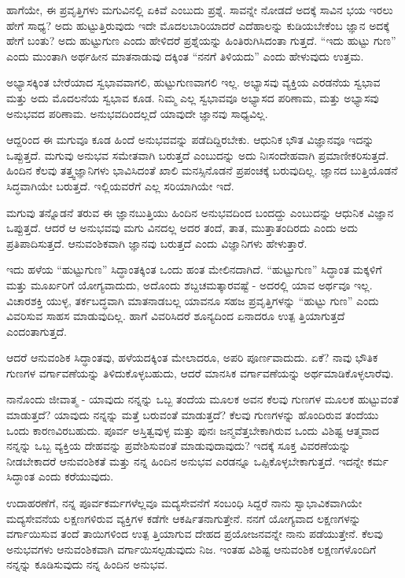ಹಾಗೆಯೇ, ಈ ಪ್ರವೃತ್ತಿಗಳು ಮಗುವಿನಲ್ಲಿ ಏಕಿವೆ ಎಂಬುದು ಪ್ರಶ್ನೆ. ಸಾವನ್ನೇ ನೋಡದೆ ಅದಕ್ಕೆ ಸಾವಿನ ಭಯ ಇರಲು ಹೇಗೆ ಸಾಧ್ಯ? ಅದು ಹುಟ್ಟುತ್ತಿರುವುದು ಇದೇ ಮೊದಲಬಾರಿಯಾದರೆ ಎದೆಹಾಲನ್ನು ಕುಡಿಯಬೇಕೆಂಬ ಜ್ಞಾನ ಅದಕ್ಕೆ ಹೇಗೆ ಬಂತು? ಅದು ಹುಟ್ಟುಗುಣ ಎಂದು ಹೇಳಿದರೆ ಪ್ರಶ್ನೆಯನ್ನು ಹಿಂತಿರುಗಿಸಿದಂತಾ ಗುತ್ತದೆ. “ಇದು ಹುಟ್ಟು ಗುಣ” ಎಂದು ಮುಂತಾಗಿ ಅರ್ಥಹೀನ ಮಾತನಾಡುವು ದಕ್ಕಿಂತ “ನನಗೆ ತಿಳಿಯದು” ಎಂದು ಹೇಳುವುದು ಉತ್ತಮ.

ಅಭ್ಯಾಸಕ್ಕಿಂತ  ಬೇರೆಯಾದ ಸ್ವಭಾವವಾಗಲಿ, ಹುಟ್ಟುಗುಣವಾಗಲಿ ಇಲ್ಲ. ಅಭ್ಯಾಸವು ವ್ಯಕ್ತಿಯ ಎರಡನೆಯ ಸ್ವಭಾವ ಮತ್ತು ಅದು ಮೊದಲನೆಯ ಸ್ವಭಾವ ಕೂಡ. ನಿಮ್ಮ ಎಲ್ಲ ಸ್ವಭಾವವೂ ಅಭ್ಯಾಸದ ಪರಿಣಾಮ, ಮತ್ತು ಅಭ್ಯಾಸವು ಅನುಭವದ ಪರಿಣಾಮ. ಅನುಭವದಿಂದಲ್ಲದೆ ಯಾವುದೇ ಜ್ಞಾನವು ಸಾಧ್ಯವಿಲ್ಲ.

ಆದ್ದರಿಂದ ಈ ಮಗುವೂ ಕೂಡ ಹಿಂದೆ ಅನುಭವವನ್ನು ಪಡೆದಿದ್ದಿರಬೇಕು. ಆಧುನಿಕ ಭೌತ ವಿಜ್ಞಾನವೂ ಇದನ್ನು ಒಪ್ಪುತ್ತದೆ. ಮಗುವು ಅನುಭವ ಸಮೇತವಾಗಿ ಬರುತ್ತದೆ ಎಂಬುದನ್ನು ಅದು ನಿಃಸಂದೇಹವಾಗಿ ಪ್ರಮಾಣೀಕರಿಸುತ್ತದೆ. ಹಿಂದಿನ ಕೆಲವು ತತ್ತ್ವಜ್ಞಾನಿಗಳು ಭಾವಿಸಿದಂತೆ ಖಾಲಿ ಮನಸ್ಸಿನೊಡನೆ ಪ್ರಪಂಚಕ್ಕೆ ಬರುವುದಿಲ್ಲ. ಜ್ಞಾನದ ಬುತ್ತಿಯೊಡನೆ ಸಿದ್ಧವಾಗಿಯೇ ಬರುತ್ತದೆ. ಇಲ್ಲಿಯವರೆಗೆ ಎಲ್ಲ ಸರಿಯಾಗಿಯೇ ಇದೆ.

ಮಗುವು ತನ್ನೊಡನೆ ತರುವ ಈ ಜ್ಞಾನಬುತ್ತಿಯು ಹಿಂದಿನ ಅನುಭವದಿಂದ ಬಂದದ್ದು ಎಂಬುದನ್ನು ಆಧುನಿಕ ವಿಜ್ಞಾನ ಒಪ್ಪುತ್ತದೆ. ಆದರೆ ಆ ಅನುಭವವು ಮಗು ವಿನದಲ್ಲ ಅದರ ತಂದೆ, ತಾತ, ಮುತ್ತಾತಂದಿರದು ಎಂದು ಅದು ಪ್ರತಿಪಾದಿಸುತ್ತದೆ. ಆನುವಂಶಿಕವಾಗಿ ಜ್ಞಾನವು ಬರುತ್ತದೆ ಎಂದು ವಿಜ್ಞಾನಿಗಳು ಹೇಳುತ್ತಾರೆ.

ಇದು ಹಳೆಯ “ಹುಟ್ಟುಗುಣ” ಸಿದ್ಧಾಂತಕ್ಕಿಂತ ಒಂದು ಹಂತ ಮೇಲಿನದಾಗಿದೆ. “ಹುಟ್ಟುಗುಣ” ಸಿದ್ಧಾಂತ ಮಕ್ಕಳಿಗೆ ಮತ್ತು ಮೂರ್ಖರಿಗೆ ಯೋಗ್ಯವಾದುದು, ಅದೊಂದು ಶಬ್ದಚಮತ್ಕಾರವಷ್ಟೆ - ಅದರಲ್ಲಿ ಯಾವ ಅರ್ಥವೂ ಇಲ್ಲ. ವಿಚಾರಶಕ್ತಿ ಯುಳ್ಳ, ತರ್ಕಬದ್ಧವಾಗಿ ಮಾತನಾಡಬಲ್ಲ ಯಾವನೂ ಸಹಜ ಪ್ರವೃತ್ತಿಗಳನ್ನು “ಹುಟ್ಟು ಗುಣ” ಎಂದು ವಿವರಿಸುವ ಸಾಹಸ ಮಾಡುವುದಿಲ್ಲ. ಹಾಗೆ ವಿವರಿಸಿದರೆ ಶೂನ್ಯದಿಂದ ಏನಾದರೂ ಉತ್ಪ ತ್ತಿಯಾಗುತ್ತದೆ ಎಂದಂತಾಗುತ್ತದೆ.

ಆದರೆ ಆನುವಂಶಿಕ ಸಿದ್ಧಾಂತವು, ಹಳೆಯದಕ್ಕಿಂತ ಮೇಲಾದರೂ, ಅಪರಿ ಪೂರ್ಣವಾದುದು. ಏಕೆ? ನಾವು ಭೌತಿಕ ಗುಣಗಳ ವರ್ಗಾವಣೆಯನ್ನು ತಿಳಿದುಕೊಳ್ಳಬಹುದು, ಆದರೆ ಮಾನಸಿಕ ವರ್ಗಾವಣೆಯನ್ನು ಅರ್ಥಮಾಡಿಕೊಳ್ಳಲಾರೆವು.

ನಾನೊಂದು ಜೀವಾತ್ಮ - ಯಾವುದು ನನ್ನನ್ನು ಒಬ್ಬ ತಂದೆಯ ಮೂಲಕ ಅವನ ಕೆಲವು ಗುಣಗಳ ಮೂಲಕ ಹುಟ್ಟುವಂತೆ ಮಾಡುತ್ತದೆ? ಯಾವುದು ನನ್ನನ್ನು ಮತ್ತೆ ಬರುವಂತೆ ಮಾಡುತ್ತದೆ? ಕೆಲವು ಗುಣಗಳನ್ನು ಹೊಂದಿರುವ ತಂದೆಯು ಒಂದು ಕಾರಣವಿರಬಹುದು. ಪೂರ್ವ ಅಸ್ತಿತ್ವವುಳ್ಳ ಮತ್ತು ಪುನಃ ಜನ್ಮವೆತ್ತಬೇಕಾಗಿರುವ ಒಂದು ವಿಶಿಷ್ಟ ಆತ್ಮವಾದ ನನ್ನನ್ನು ಒಬ್ಬ ವ್ಯಕ್ತಿಯ ದೇಹವನ್ನು ಪ್ರವೇಶಿಸುವಂತೆ ಮಾಡುವುದಾವುದು? ಇದಕ್ಕೆ ಸೂಕ್ತ ವಿವರಣೆಯನ್ನು ನೀಡಬೇಕಾದರೆ ಆನುವಂಶಿಕತೆ ಮತ್ತು ನನ್ನ ಹಿಂದಿನ ಅನುಭವ ಎರಡನ್ನೂ ಒಪ್ಪಿಕೊಳ್ಳಬೇಕಾಗುತ್ತದೆ. ಇದನ್ನೇ ಕರ್ಮ ಸಿದ್ಧಾಂತ ಎಂದು ಕರೆಯುವುದು.

ಉದಾಹರಣೆಗೆ, ನನ್ನ ಪೂರ್ವಕರ್ಮಗಳೆಲ್ಲವೂ ಮದ್ಯಸೇವನೆಗೆ ಸಂಬಂಧಿ ಸಿದ್ದರೆ ನಾನು ಸ್ವಾಭಾವಿಕವಾಗಿಯೇ ಮದ್ಯಸೇವನೆಯ ಲಕ್ಷಣಗಳಿರುವ ವ್ಯಕ್ತಿಗಳ ಕಡೆಗೇ ಆಕರ್ಷಿತನಾಗುತ್ತೇನೆ. ನನಗೆ ಯೋಗ್ಯವಾದ ಲಕ್ಷಣಗಳನ್ನು ವರ್ಗಾಯಿಸುವ ತಂದೆ ತಾಯಿಗಳಿಂದ ಉತ್ಪ ತ್ತಿಯಾಗುವ ದೇಹದ ಪ್ರಯೋಜನವನ್ನೇ ನಾನು ಪಡೆಯುತ್ತೇನೆ. ಕೆಲವು ಅನುಭವಗಳು ಆನುವಂಶಿಕವಾಗಿ ವರ್ಗಾಯಿಸಲ್ಪಡುವುದು ನಿಜ. ಇಂತಹ ವಿಶಿಷ್ಟ ಆನುವಂಶಿಕ ಲಕ್ಷಣಗಳೊಂದಿಗೆ ನನ್ನನ್ನು ಕೂಡಿಸುವುದು ನನ್ನ ಹಿಂದಿನ ಅನುಭವ.

